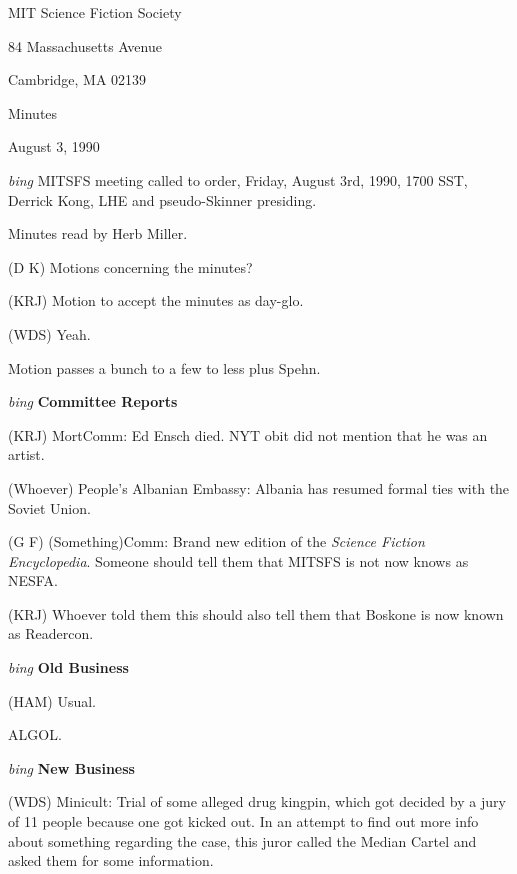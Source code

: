 \setlength{\topmargin}{-0.5in}
\setlength{\oddsidemargin}{0.0in}
\setlength{\evensidemargin}{0.0in}
\setlength{\textheight}{9in}
\setlength{\textwidth}{6.5in}



\begin{center}
MIT Science Fiction Society

84 Massachusetts Avenue

Cambridge, MA 02139

\vspace{0.2in}
Minutes

August 3, 1990

\end{center}
 
\vspace{0.15in}
{\em bing\/}  MITSFS meeting called to order, Friday, August 3rd, 1990,
1700 SST, Derrick Kong, LHE and pseudo-Skinner presiding.

Minutes read by Herb Miller.

(D K) Motions concerning the minutes?

(KRJ) Motion to accept the minutes as day-glo.

(WDS) Yeah.

Motion passes a bunch to a few to less plus Spehn.

\vspace{0.15in}
{\em bing\/} {\bf Committee Reports\/}

(KRJ) MortComm: Ed Ensch died.  NYT obit did not mention that he was an artist.

(Whoever) People's Albanian Embassy: Albania has resumed formal ties with the
Soviet Union.

(G F) (Something)Comm:  Brand new edition of the {\em Science Fiction
Encyclopedia\/}.  Someone should tell them that MITSFS is not now knows as
NESFA.

(KRJ) Whoever told them this should also tell them that Boskone is now known as
Readercon.

\vspace{.15in}
{\em bing\/} {\bf Old Business\/}

(HAM) Usual.

ALGOL.

\vspace{0.15in}
{\em bing\/} {\bf New Business\/}

(WDS) Minicult: Trial of some alleged drug kingpin, which got decided by a jury
of 11 people because one got kicked out.  In an attempt to find out more info
about something regarding the case, this juror called the Median Cartel and
asked them for some information.

